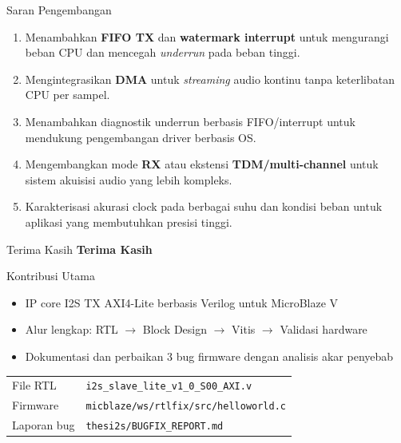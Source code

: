 \documentclass[aspectratio=169]{beamer}
\begin{document}
\begin{frame}{Saran Pengembangan}
  \begin{enumerate}
    \item Menambahkan \textbf{FIFO TX} dan \textbf{watermark interrupt} untuk
          mengurangi beban CPU dan mencegah \textit{underrun} pada beban tinggi.
    \item Mengintegrasikan \textbf{DMA} untuk \textit{streaming} audio kontinu
          tanpa keterlibatan CPU per sampel.
    \item Menambahkan diagnostik underrun berbasis FIFO/interrupt
          untuk mendukung pengembangan driver berbasis OS.
    \item Mengembangkan mode \textbf{RX} atau ekstensi \textbf{TDM/multi-channel}
          untuk sistem akuisisi audio yang lebih kompleks.
    \item Karakterisasi akurasi clock pada berbagai suhu dan kondisi beban
          untuk aplikasi yang membutuhkan presisi tinggi.
  \end{enumerate}
\end{frame}

\begin{frame}{Terima Kasih}
  \centering
  \vspace{1em}
  {\Large \textbf{Terima Kasih}}

  \vspace{1.5em}
  \begin{block}{Kontribusi Utama}
    \begin{itemize}
      \item IP core I2S TX AXI4-Lite berbasis Verilog untuk MicroBlaze V
      \item Alur lengkap: RTL $\to$ Block Design $\to$ Vitis $\to$ Validasi hardware
      \item Dokumentasi dan perbaikan 3 bug firmware dengan analisis akar penyebab
    \end{itemize}
  \end{block}

  \vspace{1em}
  \small
  \begin{tabular}{ll}
    File RTL   & \texttt{i2s\_slave\_lite\_v1\_0\_S00\_AXI.v} \\
    Firmware   & \texttt{micblaze/ws/rtlfix/src/helloworld.c} \\
    Laporan bug & \texttt{thesi2s/BUGFIX\_REPORT.md} \\
  \end{tabular}
\end{frame}
\end{document}
